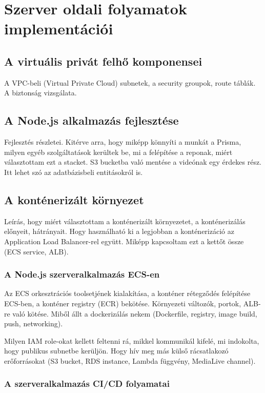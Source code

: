\chapter{Szerver oldali folyamatok implementációi}

\section{A virtuális privát felhő komponensei}

A VPC-beli (Virtual Private Cloud) subnetek, a security groupok, route táblák. A biztonság vizsgálata.

\section{A Node.js alkalmazás fejlesztése}

Fejlesztés részletei. Kitérve arra, hogy miképp könnyíti a munkát a Prisma, milyen egyéb szolgáltatások kerültek be, mi a felépítése a reponak, miért választottam ezt a stacket. S3 bucketba való mentése a videónak egy érdekes rész. Itt lehet szó az adatbázisbeli entitásokról is.

\section{A konténerizált környezet}

Leírás, hogy miért választottam a konténerizált környezetet, a konténerizálás előnyeit, hátrányait. Hogy használható ki a legjobban a konténerizáció az Application Load Balancer-rel együtt. Miképp kapcsoltam ezt a kettőt össze (ECS service, ALB).

\subsection{A Node.js szerveralkalmazás ECS-en}

Az ECS orkesztrációs toolsetjének kialakítása, a konténer rétegződés felépítése ECS-ben, a konténer registry (ECR) bekötése. Környezeti változók, portok, ALB-re való kötése. Miből állt a dockerizálás nekem (Dockerfile, registry, image build, push, networking).

Milyen IAM role-okat kellett feltenni rá, mikkel kommunikál kifelé, mi indokolta, hogy publikus subnetbe kerüljön. Hogy hív meg más külső rácsatlakozó erőforrásokat (S3 bucket, RDS instance, Lambda függvény, MediaLive channel).

\subsection{A szerveralkalmazás CI/CD folyamatai}

